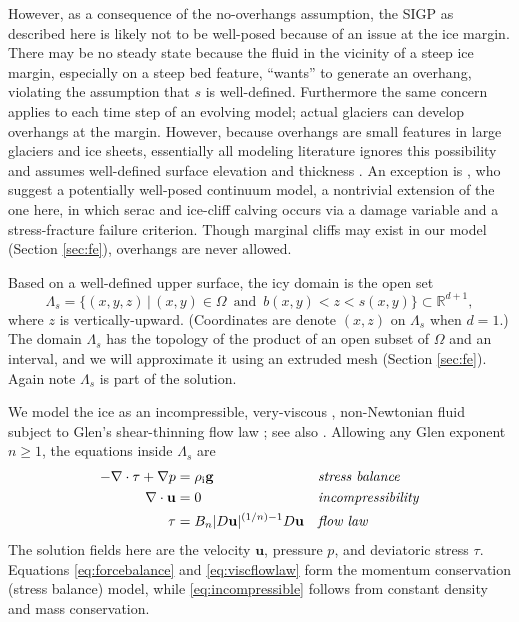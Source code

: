\documentclass[letterpaper,final,12pt,reqno]{amsart}
\theoremstyle{claim}
\newcommand{\RR}{\mathbb{R}}
\newcommand{\bg}{\mathbf{g}}
\newcommand{\bu}{\mathbf{u}}
\newcommand{\rhoi}{\rho_{\text{i}}}
\numberwithin{equation}{section}
\numberwithin{figure}{section}
\numberwithin{table}{section}
\numberwithin{theorem}{section}
\begin{document}
However, as a consequence of the no-overhangs assumption, the SIGP as described here is likely not to be well-posed because of an issue at the ice margin.  There may be no steady state because the fluid in the vicinity of a steep ice margin, especially on a steep bed feature, ``wants'' to generate an overhang, violating the assumption that $s$ is well-defined.  Furthermore the same concern applies to each time step of an evolving model; actual glaciers can develop overhangs at the margin.  However, because overhangs are small features in large glaciers and ice sheets, essentially all modeling literature ignores this possibility and assumes well-defined surface elevation and thickness \cite{Jouvetetal2008,Lengetal2012,WirbelJarosch2020}.  An exception is \cite{PralongFunk2005}, who suggest a potentially well-posed continuum model, a nontrivial extension of the one here, in which serac and ice-cliff calving occurs via a damage variable and a stress-fracture failure criterion.  Though marginal cliffs may exist in our model (Section \ref{sec:fe}), overhangs are never allowed.

Based on a well-defined upper surface, the icy domain is the open set
\begin{equation}
\Lambda_s = \{(x,y,z)\,|\,(x,y) \in \Omega \,\text{ and }\, b(x,y) < z < s(x,y)\}  \subset \RR^{d+1}, \label{eq:lambdas}
\end{equation}
where $z$ is vertically-upward.  (Coordinates are denote $(x,z)$ on $\Lambda_s$ when $d=1$.)  The domain $\Lambda_s$ has the topology of the product of an open subset of $\Omega$ and an interval, and we will approximate it using an extruded mesh (Section \ref{sec:fe}).  Again note $\Lambda_s$ is part of the solution.

We model the ice as an incompressible, very-viscous \cite{Acheson1990}, non-Newtonian fluid subject to Glen's shear-thinning flow law \cite{GreveBlatter2009}; see also \cite[Chapter 1]{FowlerNg2021}.  Allowing any Glen exponent $n\ge 1$, the equations inside $\Lambda_s$ are
\begin{align}
- \nabla \cdot \tau + \nabla p &= \rhoi \bg &&\text{\emph{stress balance}} \label{eq:forcebalance} \\
\nabla \cdot \bu &= 0 &&\text{\emph{incompressibility}} \label{eq:incompressible} \\
\tau &= B_n |D\bu|^{(1/n) - 1} D\bu  &&\text{\emph{flow law}} \label{eq:viscflowlaw}
\end{align}
The solution fields here are the velocity $\bu$, pressure $p$, and deviatoric stress $\tau$.  Equations \eqref{eq:forcebalance} and \eqref{eq:viscflowlaw} form the momentum conservation (stress balance) model, while \eqref{eq:incompressible} follows from constant density and mass conservation.
\end{document}
